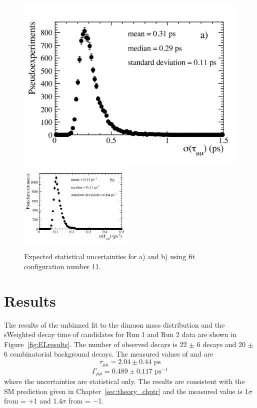{\begin{figure}[tbp]
    \centering
        \includegraphics[width=0.49 \textwidth]{./Figs/LifetimeMeasurement/5320-6000_tau_err.pdf}
        \includegraphics[width=0.49\textwidth]{./Figs/LifetimeMeasurement/5320-6000_gamma_err.pdf}

    \caption{Expected statistical uncertainties for a) \tmumu and b) \Gmumu using fit configuration number 11.}
    \label{fig:exptuncert}
\end{figure}

\clearpage

\section{Results}
\label{sec:ELresults}

The results of the unbinned \ml fit to the dimuon mass distribution and the sWeighted decay time of \bsmumu candidates for Run 1 and Run 2 data are shown in Figure~\ref{fig:ELresults}. The number of observed decays is 22 $\pm$ 6 \bsmumu decays and 20 $\pm$ 6 combinatorial background decays. The measured values of \tmumu and \Gmumu are
\begin{equation}
\tau_{\mu\mu} = 2.04 \pm 0.44  \text{ ps} 
\end{equation}
\begin{equation}
\Gamma_{\mu\mu} = 0.489  \pm 0.117 \text{ ps}^{-1}
\end{equation}
where the uncertainties are statistical only. The results are consistent with the SM prediction given in Chapter~\ref{sec:theory_chptr} and the measured value is 1$\sigma$ from \ADG = +1 and 1.4$\sigma$ from \ADG = $-$1. 

}
